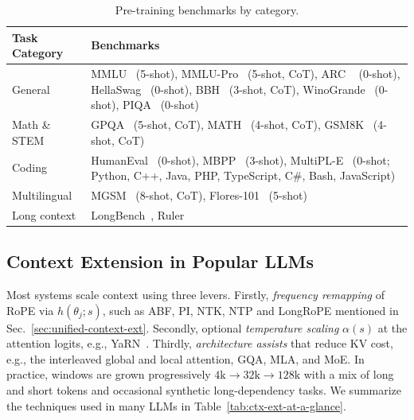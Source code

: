 \begin{table}[h]
  \centering
  \caption{Pre-training benchmarks by category.}
  \label{tab:std-benchmarks}
  \begin{tabular}{p{2.2cm}p{11cm}}
    \toprule
    \textbf{Task Category} & \textbf{Benchmarks} \\
    \midrule
    General & MMLU~\cite{hendrycks2021measuringmassivemultitasklanguage} (5-shot),
        MMLU-Pro~\cite{wang2024mmluprorobustchallengingmultitask} (5-shot, CoT),
        ARC ~\cite{clark2018thinksolvedquestionanswering} (0-shot), 
        HellaSwag~\cite{zellers2019hellaswagmachinereallyfinish} (0-shot),
        BBH~\cite{suzgun2022challengingbigbenchtaskschainofthought} (3-shot, CoT), 
        WinoGrande~\cite{sakaguchi2019winograndeadversarialwinogradschema} (0-shot),
        PIQA~\cite{bisk2019piqareasoningphysicalcommonsense} (0-shot) \\[2pt]
    \midrule
    Math \& STEM & GPQA~\cite{rein2023gpqagraduatelevelgoogleproofqa} (5-shot, CoT),
        MATH~\cite{hendrycks2021measuringmathematicalproblemsolving} (4-shot, CoT),
        GSM8K~\cite{cobbe2021gsm8k} (4-shot, CoT) \\[2pt]
    \midrule
    Coding & HumanEval~\cite{chen2021evaluating} (0-shot), 
        MBPP~\cite{austin2021programsynthesislargelanguage} (3-shot),  
        MultiPL-E~\cite{cassano2022multiplescalableextensibleapproach} (0-shot; Python, C++, Java, PHP, TypeScript, C\#, Bash, JavaScript) \\[2pt]
    \midrule
    Multilingual & MGSM~\cite{shi2022languagemodelsmultilingualchainofthought} (8-shot, CoT),
        Flores-101~\cite{goyal2021flores101evaluationbenchmarklowresource} (5-shot) \\[2pt]
    \midrule
    Long context & LongBench~\cite{bai2024longbenchbilingualmultitaskbenchmark}, 
        Ruler~\cite{hsieh2024rulerwhatsrealcontext} \\[2pt]
    \bottomrule
  \end{tabular}
\end{table}

\subsection{Context Extension in Popular LLMs}
\label{sec:ctx-ext-popular}

Most systems scale context using three levers. Firstly, \emph{frequency remapping} of RoPE via \(h(\theta_j;s)\), such as ABF, PI, NTK, NTP and LongRoPE mentioned in Sec.~\ref{sec:unified-context-ext}. Secondly, optional \emph{temperature scaling} \(\alpha(s)\) at the attention logits, e.g., YaRN~\cite{peng2023yarn}. Thirdly, \emph{architecture assists} that reduce KV cost, e.g., the interleaved global and local attention, GQA, MLA, and MoE. 
In practice, windows are grown progressively \(4\text{k}\!\to\!32\text{k}\!\to\!128\text{k}\) with a mix of long and short tokens and occasional synthetic long-dependency tasks. We summarize the techniques used in many LLMs in Table~\ref{tab:ctx-ext-at-a-glance}.

